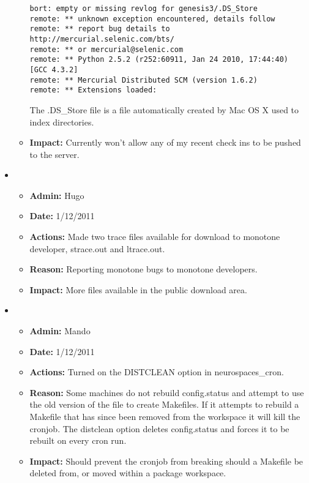 \documentclass[12pt]{article}
\begin{document}
\begin{itemize}
\begin{itemize}
\begin{verbatim}
bort: empty or missing revlog for genesis3/.DS_Store
remote: ** unknown exception encountered, details follow
remote: ** report bug details to http://mercurial.selenic.com/bts/
remote: ** or mercurial@selenic.com
remote: ** Python 2.5.2 (r252:60911, Jan 24 2010, 17:44:40) [GCC 4.3.2]
remote: ** Mercurial Distributed SCM (version 1.6.2)
remote: ** Extensions loaded: 

\end{verbatim} 

The .DS\_Store file is a file automatically created by Mac OS X used to index directories.  

\item[] {\bf Impact:} Currently won't allow any of my recent check ins to be pushed to the server. 
\end{itemize}

\item
\begin{itemize}
\item[] {\bf Admin:} Hugo
\item[] {\bf Date:} 1/12/2011 
\item[] {\bf Actions:} Made two trace files available for download to monotone developer, strace.out and ltrace.out.
\item[] {\bf Reason:} Reporting monotone bugs to monotone developers.
\item[] {\bf Impact:} More files available in the public download area.
\end{itemize}

\item
\begin{itemize}
\item[] {\bf Admin:} Mando
\item[] {\bf Date:} 1/12/2011 
\item[] {\bf Actions:} Turned on the DISTCLEAN option in neurospaces\_cron.
\item[] {\bf Reason:} Some machines do not rebuild config.status and attempt to use the old version of the file to create Makefiles. If it attempts to rebuild a Makefile that has since been removed from the workspace it will kill the cronjob. The distclean option deletes config.status and forces it to be rebuilt on every cron run. 
\item[] {\bf Impact:} Should prevent the cronjob from breaking should a Makefile be deleted from, or moved within a package workspace.
\end{itemize}


\end{itemize}
\end{document}
